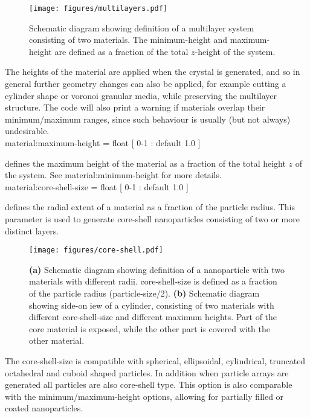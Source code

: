 \begin{figure*}[!h]
\center
\texttt{[image: figures/multilayers.pdf]}
\caption{Schematic diagram showing definition of a multilayer system consisting of two materials. The minimum-height and maximum-height are defined as a fraction of the total $z$-height of the system.}
\label{fig:multilayer}
\end{figure*}

The heights of the material are applied when the crystal is generated, and so in general further geometry changes can also be applied, for example cutting a cylinder shape or voronoi granular media, while preserving the multilayer structure. The code will also print a warning if materials overlap their minimum/maximum ranges, since such behaviour is usually (but not always) undesirable.\\

{\zicf material:maximum-height = float [ 0-1 : default 1.0 ]} defines the maximum height of the material as a fraction of the total height $z$ of the system. See material:minimum-height for more details.\\

{\zicf material:core-shell-size = float [ 0-1 : default 1.0 ]} defines the radial extent of a material as a fraction of the particle radius. This parameter is used to generate core-shell nanoparticles consisting of two or more distinct layers.
\begin{figure*}[!htb]
\center
\texttt{[image: figures/core-shell.pdf]}
\caption{\textbf{(a)} Schematic diagram showing definition of a nanoparticle with two materials with different radii. core-shell-size is defined as a fraction of the particle radius (particle-size/2). \textbf{(b)} Schematic diagram showing side-on iew of a cylinder, consisting of two materials with different core-shell-size and different maximum heights. Part of the core material is exposed, while the other part is covered with the other material.}
\label{fig:core-shell}
\end{figure*}
The core-shell-size is compatible with spherical, ellipsoidal, cylindrical, truncated octahedral and cuboid shaped particles. In addition when particle arrays are generated all particles are also core-shell type. This option is also comparable with the minimum/maximum-height options, allowing for partially filled or coated nanoparticles.\\

